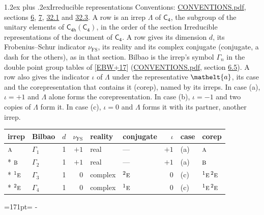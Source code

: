 \documentclass[10pt,a4paper]{article}
\makeatletter
\renewcommand\section{\@startsection{section}{1}{\z@}{-3ex plus -1ex minus -.2ex}%
  {1.2ex plus .2ex}{\normalfont\large\sffamily\bfseries\color{parttitle}}}
\newcommand{\needspace}[1]{\par\penalty-100\begingroup\dimen0=#1\relax\dimen2=\pagegoal
  \advance\dimen2-\pagetotal\ifdim\dimen0>\dimen2\relax\ifdim\dimen2>0pt\vfil\break\fi\fi
  \endgroup}
\numberwithin{equation}{section}
\newcommand{\eltfont}[1]{{\let\sigma\eltsigma\mathelt{#1}}}
\newcommand{\grp}[1]{\mathsf{#1}}
\newcommand{\irr}[1]{\text{\normalfont\scshape #1}}
\newcommand{\conjpair}[1]{{}^{#1}}
\newcommand{\elt}[1]{\eltfont{#1}}
\newcommand{\fsind}{\nu_{\mathrm{FS}}}
\makeatother
\begin{document}
\section{Irreducible representations}\label{s:irreps}
Conventions: \href{../../CONVENTIONS.pdf}{CONVENTIONS.pdf}, sections \href{../../../rotation/CONVENTIONS.pdf\#conv.6}{6}, \href{../../../rotation/CONVENTIONS.pdf\#conv.7}{7}, \href{../../CONVENTIONS.pdf\#conv.32.1}{32.1} and \href{../../CONVENTIONS.pdf\#conv.32.3}{32.3}.
\leavevmode\label{n:irrep.Delta}A row is an irrep $\Lambda$ of $\grp{C_{4}}$, the subgroup of the unitary elements of $\grp{C_{4h}}(\grp{C_{4}})$, in the order of the section Irreducible representations of the document of \href{../../../rotation/data/pdf/C4.pdf}{$\grp{C_{4}}$}. \label{n:index.dimension}\label{n:index.frobenius}\label{n:head.irrep}\label{n:head.reality}\label{n:head.conjugate}A row gives its dimension $d$, its Frobenius--Schur indicator $\fsind$, its reality and its complex conjugate (conjugate, a dash for the others), as in that section. \label{n:head.bilbao}\label{n:irrep.alias.gamma}Bilbao is the irrep's symbol $\Gamma_n$ in the double point group tables of [\href{../../../REFERENCES.pdf\#ref.EBW+17}{EBW+17}] (\href{../../CONVENTIONS.pdf}{CONVENTIONS.pdf}, section \href{../../../rotation/CONVENTIONS.pdf\#conv.6.5}{6.5}). \label{n:head.case.corep}\label{n:head.corep}A row also gives the indicator $\iota$ of $\Lambda$ under the representative $\elt{a}$, its case and the corepresentation that contains it (corep), named by its irreps. In case (a), $\iota = +1$ and $\Lambda$ alone forms the corepresentation. In case (b), $\iota = -1$ and two copies of $\Lambda$ form it. In case (c), $\iota = 0$ and $\Lambda$ forms it with its partner, another irrep.
\setlength{\emergencystretch}{2em}\par\setlength{\emergencystretch}{0pt}
{\small\renewcommand{\arraystretch}{1.25}\setlength{\tabcolsep}{4pt}\begin{longtable}{@{}llrrllrll@{}}\toprule
irrep & Bilbao & $d$ & $\fsind$ & reality & conjugate & $\iota$ & case & corep\\\midrule\endhead
\bottomrule\endfoot\endlastfoot
$\irr{a}$ & $\Gamma_{1}$ & 1 & $+1$ & real & --- & $+1$ & (a) & $\irr{a}$\\*
$\irr{b}$ & $\Gamma_{2}$ & 1 & $+1$ & real & --- & $+1$ & (a) & $\irr{b}$\\*
$\conjpair{1}\irr{e}$ & $\Gamma_{3}$ & 1 & $0$ & complex & $\conjpair{2}\irr{e}$ & $0$ & (c) & $\conjpair{1}\irr{e}\,\conjpair{2}\irr{e}$\\*
$\conjpair{2}\irr{e}$ & $\Gamma_{4}$ & 1 & $0$ & complex & $\conjpair{1}\irr{e}$ & $0$ & (c) & $\conjpair{1}\irr{e}\,\conjpair{2}\irr{e}$\\
\bottomrule\end{longtable}}
\needspace{171pt}
\end{document}
